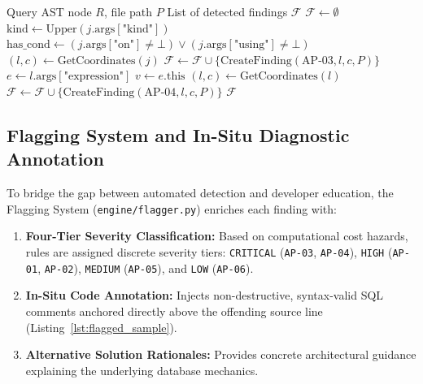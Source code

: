 \documentclass[conference]{IEEEtran}
\begin{document}
\begin{algorithm}[t]
\caption{Detection of Cartesian Joins and Leading Wildcards}
\label{alg:cartesian_wildcard}
\begin{algorithmic}[1]
\REQUIRE Query AST node $R$, file path $P$
\ENSURE List of detected findings $\mathcal{F}$
\STATE $\mathcal{F} \leftarrow \emptyset$
    \STATE $\text{kind} \leftarrow \text{Upper}(j.\text{args}[\text{"kind"}])$
    \STATE $\text{has\_cond} \leftarrow (j.\text{args}[\text{"on"}] \ne \bot) \lor (j.\text{args}[\text{"using"}] \ne \bot)$
        \STATE $(l, c) \leftarrow \text{GetCoordinates}(j)$
        \STATE $\mathcal{F} \leftarrow \mathcal{F} \cup \{\text{CreateFinding}(\text{AP-03}, l, c, P)\}$
    \ENDIF
\ENDFOR
{}
    \STATE $e \leftarrow l.\text{args}[\text{"expression"}]$
        \STATE $v \leftarrow e.\text{this}$
            \STATE $(l, c) \leftarrow \text{GetCoordinates}(l)$
            \STATE $\mathcal{F} \leftarrow \mathcal{F} \cup \{\text{CreateFinding}(\text{AP-04}, l, c, P)\}$
        \ENDIF
    \ENDIF
\ENDFOR
\RETURN $\mathcal{F}$
\end{algorithmic}
\end{algorithm}

\subsection{Flagging System and In-Situ Diagnostic Annotation}
To bridge the gap between automated detection and developer education, the Flagging System (\texttt{engine/flagger.py}) enriches each finding with:
\begin{enumerate}
    \item \textbf{Four-Tier Severity Classification:} Based on computational cost hazards, rules are assigned discrete severity tiers: \texttt{CRITICAL} (\texttt{AP-03}, \texttt{AP-04}), \texttt{HIGH} (\texttt{AP-01}, \texttt{AP-02}), \texttt{MEDIUM} (\texttt{AP-05}), and \texttt{LOW} (\texttt{AP-06}).
    \item \textbf{In-Situ Code Annotation:} Injects non-destructive, syntax-valid SQL comments anchored directly above the offending source line (Listing~\ref{lst:flagged_sample}).
    \item \textbf{Alternative Solution Rationales:} Provides concrete architectural guidance explaining the underlying database mechanics.
\end{enumerate}
\end{document}
